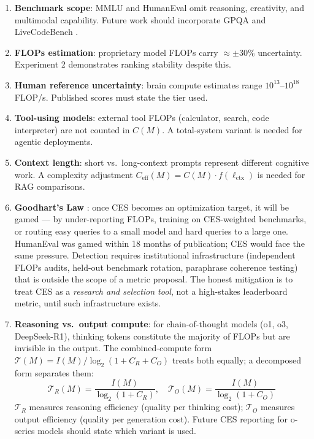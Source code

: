 \documentclass[12pt]{article}
\begin{document}
\begin{enumerate}
    \item \textbf{Benchmark scope}: MMLU and HumanEval omit reasoning, creativity, and multimodal capability. Future work should incorporate GPQA \cite{rein2023} and LiveCodeBench \cite{jain2024}.
    \item \textbf{FLOPs estimation}: proprietary model FLOPs carry $\approx\pm30\%$ uncertainty. Experiment 2 demonstrates ranking stability despite this.
    \item \textbf{Human reference uncertainty}: brain compute estimates range $10^{13}$--$10^{18}$ FLOP/s. Published scores must state the tier used.
    \item \textbf{Tool-using models}: external tool FLOPs (calculator, search,
    code interpreter) are not counted in $C(M)$. A total-system variant is
    needed for agentic deployments.
    \item \textbf{Context length}: short vs.\ long-context prompts represent
    different cognitive work. A complexity adjustment
    $C_{\text{eff}}(M) = C(M) \cdot f(\ell_{\text{ctx}})$
    is needed for RAG comparisons.
    \item \textbf{Goodhart's Law} \cite{goodhart1975}: once CES becomes an optimization target, it will be gamed --- by under-reporting FLOPs, training on CES-weighted benchmarks, or routing easy queries to a small model and hard queries to a large one. HumanEval was gamed within 18 months of publication; CES would face the same pressure. Detection requires institutional infrastructure (independent FLOPs audits, held-out benchmark rotation, paraphrase coherence testing) that is outside the scope of a metric proposal. The honest mitigation is to treat CES as a \textit{research and selection tool}, not a high-stakes leaderboard metric, until such infrastructure exists.
    \item \textbf{Reasoning vs.\ output compute}: for chain-of-thought models (o1, o3, DeepSeek-R1), thinking tokens constitute the majority of FLOPs but are invisible in the output. The combined-compute form $\mathcal{T}(M) = I(M)/\log_2(1+C_R+C_O)$ treats both equally; a decomposed form separates them:
    \begin{equation*}
    \mathcal{T}_R(M) = \frac{I(M)}{\log_2(1+C_R)}, \quad
    \mathcal{T}_O(M) = \frac{I(M)}{\log_2(1+C_O)}
    \end{equation*}
    $\mathcal{T}_R$ measures reasoning efficiency (quality per thinking cost); $\mathcal{T}_O$ measures output efficiency (quality per generation cost). Future CES reporting for o-series models should state which variant is used.

\end{enumerate}
\end{document}
